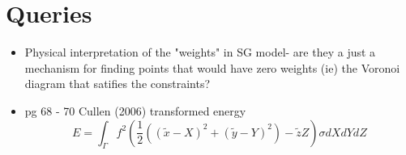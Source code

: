 \documentclass[]{article}
\begin{document}
	\section{Queries}
	\begin{itemize}
		\item Physical interpretation of the "weights" in SG model- are they a just a mechanism for finding points that would have zero weights (ie) the Voronoi diagram that satifies the constraints?
		\item pg 68 - 70 Cullen (2006) transformed energy
		 \begin{equation}
		 E = \int_ \Gamma f^2 \left(\frac{1}{2}\left(\left( \tilde{x} - X\right)^2 +\left(\tilde{y} - Y\right)^2\right) - \tilde{z}Z\right)\sigma dXdYdZ
		 \end{equation}
	\end{itemize}
\end{document}
